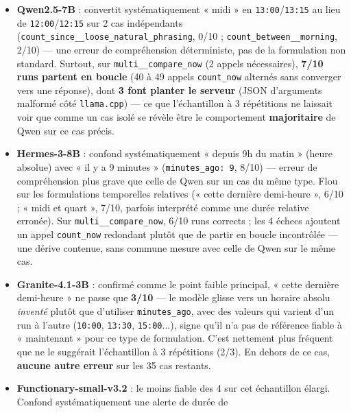 \documentclass[11pt,a4paper]{article}
\begin{document}
    \begin{itemize}[leftmargin=1.5em]
      \item \textbf{Qwen2.5-7B} : convertit systématiquement « midi » en
        \texttt{13:00}/\texttt{13:15} au lieu de \texttt{12:00}/\texttt{12:15}
        sur 2 cas indépendants (\texttt{count\_since\_\_loose\_natural\_phrasing},
        0/10 ; \texttt{count\_between\_\_morning}, 2/10) --- une erreur de
        compréhension déterministe, pas de la formulation non standard.
        Surtout, sur \texttt{multi\_\_compare\_now} (2 appels nécessaires),
        \textbf{7/10 runs partent en boucle} (40 à 49 appels
        \texttt{count\_now} alternés sans converger vers une réponse), dont
        \textbf{3 font planter le serveur} (JSON d'arguments malformé côté
        \texttt{llama.cpp}) --- ce que l'échantillon à 3 répétitions ne
        laissait voir que comme un cas isolé se révèle être le comportement
        \textbf{majoritaire} de Qwen sur ce cas précis.
      \item \textbf{Hermes-3-8B} : confond systématiquement « depuis 9h du
        matin » (heure absolue) avec « il y a 9 minutes »
        (\texttt{minutes\_ago: 9}, 8/10) --- erreur de compréhension plus
        grave que celle de Qwen sur un cas du même type. Flou sur les
        formulations temporelles relatives (« cette dernière demi-heure »,
        6/10 ; « midi et quart », 7/10, parfois interprété comme une durée
        relative erronée). Sur \texttt{multi\_\_compare\_now}, 6/10 runs
        corrects ; les 4 échecs ajoutent un appel \texttt{count\_now}
        redondant plutôt que de partir en boucle incontrôlée --- une
        dérive contenue, sans commune mesure avec celle de Qwen sur le même
        cas.
      \item \textbf{Granite-4.1-3B} : confirmé comme le point faible
        principal, « cette dernière demi-heure » ne passe que \textbf{3/10}
        --- le modèle glisse vers un horaire absolu \emph{inventé} plutôt
        que d'utiliser \texttt{minutes\_ago}, avec des valeurs qui varient
        d'un run à l'autre (\texttt{10:00}, \texttt{13:30}, \texttt{15:00}...),
        signe qu'il n'a pas de référence fiable à « maintenant » pour ce
        type de formulation. C'est nettement plus fréquent que ne le
        suggérait l'échantillon à 3 répétitions (2/3). En dehors de ce cas,
        \textbf{aucune autre erreur} sur les 35 cas restants.
      \item \textbf{Functionary-small-v3.2} : le moins fiable des 4 sur cet
        échantillon élargi. Confond systématiquement une alerte de durée de

\end{itemize}
\end{document}
